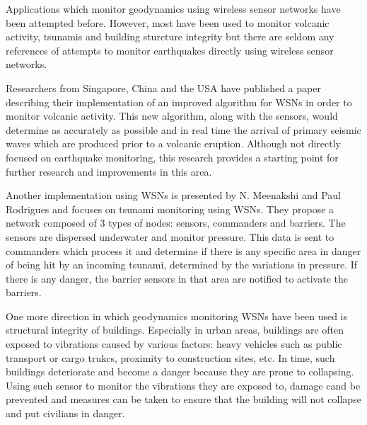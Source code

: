Applications which monitor geodynamics using wireless sensor networks have been attempted before. However, most have been used to
monitor volcanic activity, tsunamis and building sturcture integrity but there are seldom any references of attempts to monitor 
earthquakes directly using wireless sensor networks.

Researchers from Singapore, China and the USA have published a paper describing their implementation of an improved algorithm 
for WSNs in order to monitor volcanic activity. This new algorithm, along with the sensors, would determine as accurately as 
possible and in real time the arrival of primary seismic waves which are produced prior to a volcanic eruption. Although not 
directly focused on earthquake monitoring, this research provides a starting point for further research and improvements in 
this area.

Another implementation using WSNs is presented by N. Meenakshi and Paul Rodrigues and focuses on tsunami monitoring using WSNs. 
They propose a network composed of 3 types of nodes: sensors, commanders and barriers. The sensors are dispersed underwater 
and monitor pressure. This data is sent to commanders which process it and determine if there is any specific area in danger 
of being hit by an incoming tsunami, determined by the variations in pressure. If there is any danger, the barrier sensors in 
that area are notified to activate the barriers.

One more direction in which geodynamics monitoring WSNs have been used is structural integrity of buildings. Especially in urban 
areas, buildings are often exposed to vibrations caused by various factors: heavy vehicles such as public transport or cargo trukcs, 
proximity to construction sites, etc. In time, such buildings deteriorate and become a danger because they are prone to collapsing. 
Using such sensor to monitor the vibrations they are exposed to, damage cand be prevented and measures can be taken to ensure that 
the building will not collapse and put civilians in danger.
